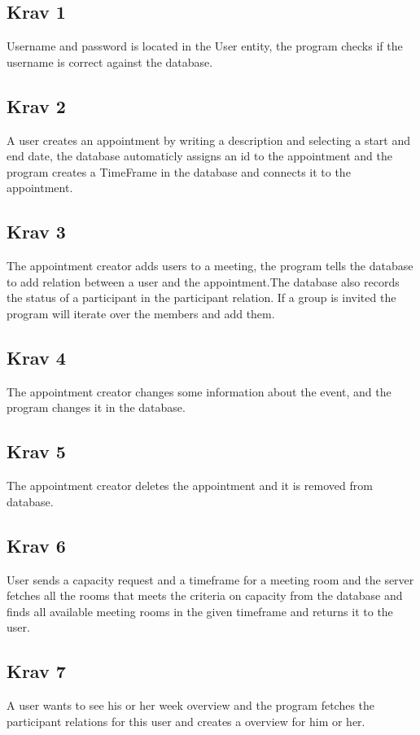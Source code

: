 


\subsection{Krav 1}
Username and password is located in the User entity, the program checks if the username is correct against the database.

\subsection{Krav 2}
A user creates an appointment by writing a description and selecting a start and end date, the database automaticly assigns an id to the appointment and the program creates a TimeFrame in the database and connects it to the appointment.

\subsection{Krav 3}
The appointment creator adds users to a meeting, the program tells the database to add relation between a user and the appointment.The database also records the status of a participant in the participant relation. If a group is invited the program will iterate over the members and add them.

\subsection{Krav 4}
The appointment creator changes some information about the event, and the program changes it in the database.

\subsection{Krav 5}
The appointment creator deletes the appointment and it is removed from database.

\subsection{Krav 6}
User sends a capacity request and a timeframe for a meeting room and the server fetches all the rooms that meets the criteria on capacity from the database and finds all available meeting rooms in the given timeframe and returns it to the user.

\subsection{Krav 7}
A user wants to see his or her week overview and the program fetches the participant relations for this user and creates a overview for him or her. 

